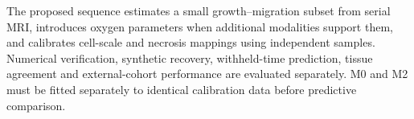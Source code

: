 The proposed sequence estimates a small growth--migration subset from serial MRI, introduces oxygen parameters when additional modalities support them, and calibrates cell-scale and necrosis mappings using independent samples. Numerical verification, synthetic recovery, withheld-time prediction, tissue agreement and external-cohort performance are evaluated separately. M0 and M2 must be fitted separately to identical calibration data before predictive comparison.
